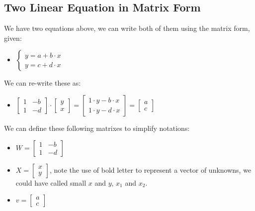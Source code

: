 \documentclass[
]{book}
\providecommand{\tightlist}{%
  \setlength{\itemsep}{0pt}\setlength{\parskip}{0pt}}
\begin{document}
\hypertarget{two-linear-equation-in-matrix-form}{%
\subsection{Two Linear Equation in Matrix Form}\label{two-linear-equation-in-matrix-form}}

We have two equations above, we can write both of them using the matrix
form, given:

\begin{itemize}
\tightlist
\item
  \(\displaystyle \left\lbrace \begin{array}{c} y=a+b\cdot x\\ y=c+d\cdot x \end{array}\right.\)
\end{itemize}

We can re-write these as:

\begin{itemize}
\tightlist
\item
  \(\displaystyle \left\lbrack \begin{array}{cc} 1 & -b\\ 1 & -d \end{array}\right\rbrack \cdot \left\lbrack \begin{array}{c} y\\ x \end{array}\right\rbrack =\left\lbrack \begin{array}{cc} 1\cdot y-b\cdot x\\ 1\cdot y-d\cdot x \end{array}\right\rbrack =\left\lbrack \begin{array}{c} a\\ c \end{array}\right\rbrack\)
\end{itemize}

We can define these following matrixes to simplify notations:

\begin{itemize}
\item
  \(\displaystyle W=\left\lbrack \begin{array}{cc} 1 & -b\\ 1 & -d \end{array}\right\rbrack\)
\item
  \(X=\left\lbrack \begin{array}{c} x\\ y \end{array}\right\rbrack\), note the use of bold letter to represent
  a vector of unknowns, we could have called small \(x\) and \(y\), \(x_1\)
  and \(x_2\).
\item
  \(\displaystyle v=\left\lbrack \begin{array}{c} a\\ c \end{array}\right\rbrack\)
\end{itemize}
\end{document}
